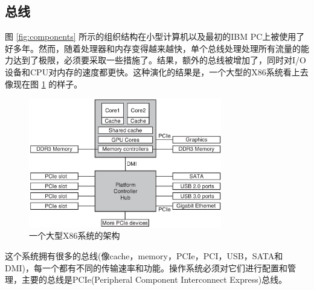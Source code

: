 	\subsection{总线}
	
	图 \ref{fig:components} 所示的组织结构在小型计算机以及最初的IBM PC上被使用了好多年。然而，随着处理器和内存变得越来越快，单个总线处理处理所有流量的能力达到了极限，必须要采取一些措施了。结果，额外的总线被增加了，同时对I/O设备和CPU对内存的速度都更快。这种演化的结果是，一个大型的X86系统看上去像现在图 \ref{fig:x86} 的样子。

	\begin{figure}[ht]\small
		\centering
		\includegraphics[width=0.75\textwidth]{FIG/1-12.png}
		\caption{一个大型X86系统的架构}\label{fig:x86}
	\end{figure}

	这个系统拥有很多的总线(像cache，memory，PCIe，PCI，USB，SATA和DMI)，每一个都有不同的传输速率和功能。操作系统必须对它们进行配置和管理，主要的总线是PCIe(Peripheral Component Interconnect Express)总线。
	
